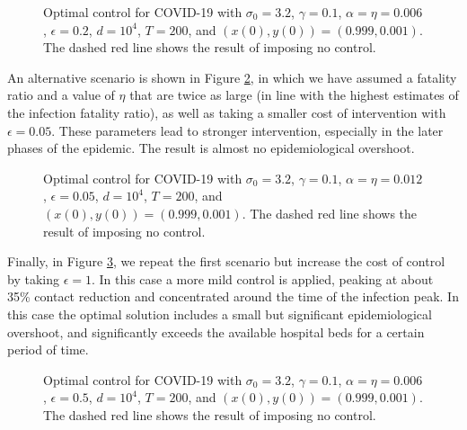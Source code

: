 \documentclass[english,12pt,letter]{article}
\newcommand{\Rnot}{\sigma_0}
\begin{document}
\begin{figure}
    \centering
    \caption{Optimal control for COVID-19 with $\Rnot=3.2$, $\gamma=0.1$,
                $\alpha=\eta=0.006$, $\epsilon=0.2$, $d=10^4$, $T=200$, and $(x(0),y(0)) =
                (0.999,0.001)$.
                The dashed red line shows the result of imposing no control.
                \label{fig:real-world-1}}
\end{figure}

An alternative scenario is shown in Figure \ref{fig:real-world-2}, in which
we have assumed a fatality ratio and a value of $\eta$ that are twice as
large (in line with the highest estimates of the infection fatality ratio),
as well as taking a smaller cost of intervention with $\epsilon=0.05$.  These
parameters lead to stronger intervention, especially in the later phases of the epidemic.
The result is almost no epidemiological overshoot.

\begin{figure}
    \centering
    \caption{Optimal control for COVID-19 with $\Rnot=3.2$, $\gamma=0.1$,
                $\alpha=\eta=0.012$, $\epsilon=0.05$, $d=10^4$, $T=200$, and $(x(0),y(0)) =
                (0.999,0.001)$.
                The dashed red line shows the result of imposing no control.
                \label{fig:real-world-2}}
\end{figure}

Finally, in Figure \ref{fig:real-world-3}, we repeat the first scenario
but increase the cost of control by taking $\epsilon=1$.
In this case a more mild control is applied, peaking at about
35\% contact reduction and concentrated around the time of the
infection peak.  In this case the optimal solution includes a small
but significant epidemiological overshoot, and significantly exceeds
the available hospital beds for a certain period of time.

\begin{figure}
    \centering
    \caption{Optimal control for COVID-19 with $\Rnot=3.2$, $\gamma=0.1$,
                $\alpha=\eta=0.006$, $\epsilon=0.5$, $d=10^4$, $T=200$, and $(x(0),y(0)) =
                (0.999,0.001)$.
                The dashed red line shows the result of imposing no control.
                \label{fig:real-world-3}}
\end{figure}
\end{document}
